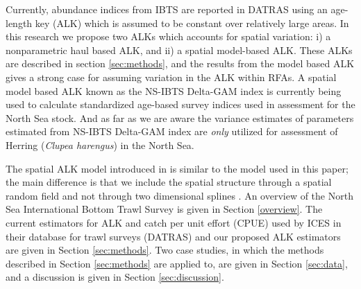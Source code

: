 \documentclass[a4paper 12pt]{article}
\numberwithin{equation}{section}
\begin{document}
Currently, abundance indices from IBTS are reported in DATRAS \citep{datras} using an age-length key (ALK) \citep{fridriksson1934calculation} which is assumed to be constant over relatively large areas. In this research we propose two ALKs which accounts for spatial variation: i) a nonparametric  haul based ALK, and ii) a spatial model-based ALK. These ALKs are described in section \ref{sec:methods}, and the results from the model based ALK gives a strong case for assuming variation in the ALK within RFAs. %
A spatial model based ALK \citep{berg2012spatial, berg2014evaluation} known as the NS-IBTS Delta-GAM index \citep{ICES2016b} is currently being used to calculate standardized age-based survey indices used in assessment for the North Sea stock. And as far as we are aware the variance estimates of parameters estimated from NS-IBTS Delta-GAM index  are \textit{only} utilized for assessment of Herring (\textit{Clupea harengus}) in the North Sea.

The spatial ALK model introduced in \citet{berg2012spatial} is similar to the model used in this paper; the main difference is that we include the spatial structure through a spatial random field \citep{lindgren2011explicit} and not through two dimensional splines \citep{wood2017generalized}.%
 An  overview of the  North Sea International Bottom Trawl Survey is given in Section \ref{overview}. The current estimators for ALK and catch per unit effort (CPUE) used by ICES in their database for trawl surveys (DATRAS) and our proposed ALK estimators are given in Section \ref{sec:methods}. Two case studies, in which the methods described in Section \ref{sec:methods} are applied to, are given in Section \ref{sec:data}, and a discussion is given in Section \ref{sec:discussion}.%
\end{document}
